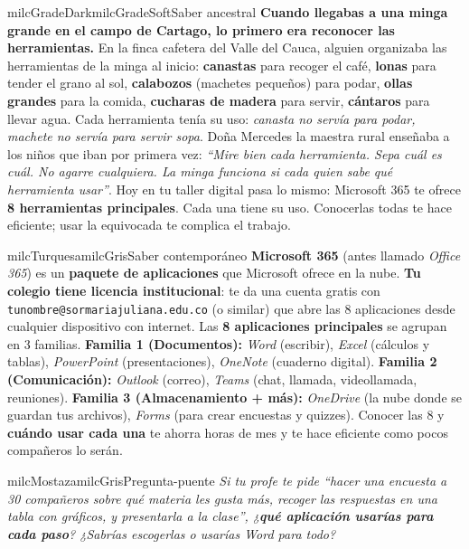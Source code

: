 \documentclass[11pt,letterpaper]{article}
\begin{document}
\begin{softbox}{milcGradeDark}{milcGradeSoft}{Saber ancestral}
\textbf{Cuando llegabas a una minga grande en el campo de Cartago, lo primero era reconocer las herramientas.} En la finca cafetera del Valle del Cauca, alguien organizaba las herramientas de la minga al inicio: \textbf{canastas} para recoger el café, \textbf{lonas} para tender el grano al sol, \textbf{calabozos} (machetes pequeños) para podar, \textbf{ollas grandes} para la comida, \textbf{cucharas de madera} para servir, \textbf{cántaros} para llevar agua. Cada herramienta tenía su uso: \emph{canasta no servía para podar, machete no servía para servir sopa}. Doña Mercedes la maestra rural enseñaba a los niños que iban por primera vez: \emph{``Mire bien cada herramienta. Sepa cuál es cuál. No agarre cualquiera. La minga funciona si cada quien sabe qué herramienta usar''}. Hoy en tu taller digital pasa lo mismo: Microsoft 365 te ofrece \textbf{8 herramientas principales}. Cada una tiene su uso. Conocerlas todas te hace eficiente; usar la equivocada te complica el trabajo.
\end{softbox}

\begin{softbox}{milcTurquesa}{milcGris}{Saber contemporáneo}
\textbf{Microsoft 365} (antes llamado \emph{Office 365}) es un \textbf{paquete de aplicaciones} que Microsoft ofrece en la nube. \textbf{Tu colegio tiene licencia institucional}: te da una cuenta gratis con \texttt{tunombre@sormariajuliana.edu.co} (o similar) que abre las 8 aplicaciones desde cualquier dispositivo con internet. Las \textbf{8 aplicaciones principales} se agrupan en 3 familias. \textbf{Familia 1 (Documentos):} \emph{Word} (escribir), \emph{Excel} (cálculos y tablas), \emph{PowerPoint} (presentaciones), \emph{OneNote} (cuaderno digital). \textbf{Familia 2 (Comunicación):} \emph{Outlook} (correo), \emph{Teams} (chat, llamada, videollamada, reuniones). \textbf{Familia 3 (Almacenamiento + más):} \emph{OneDrive} (la nube donde se guardan tus archivos), \emph{Forms} (para crear encuestas y quizzes). Conocer las 8 y \textbf{cuándo usar cada una} te ahorra horas de mes y te hace eficiente como pocos compañeros lo serán.
\end{softbox}

\begin{softbox}{milcMostaza}{milcGris}{Pregunta-puente}
\textit{Si tu profe te pide \emph{``hacer una encuesta a 30 compañeros sobre qué materia les gusta más, recoger las respuestas en una tabla con gráficos, y presentarla a la clase''}, ¿\textbf{qué aplicación usarías para cada paso}? ¿Sabrías escogerlas o usarías Word para todo?}
\end{softbox}
\end{document}
